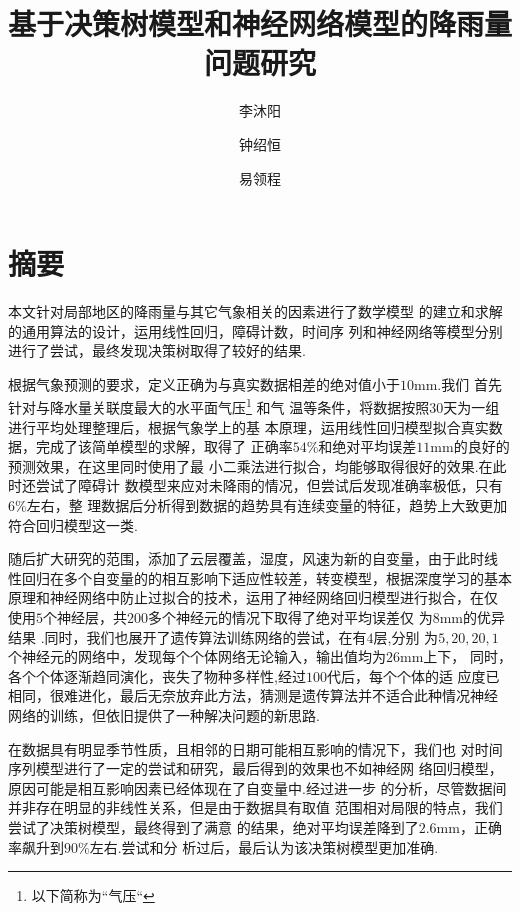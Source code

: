 \documentclass[UTF8, a4paper]{ctexart}
\title{基于决策树模型和神经网络模型的降雨量问题研究}
\author{李沐阳 \and 钟绍恒 \and 易领程}
\begin{document}
\maketitle



\section{摘要}

本文针对局部地区的降雨量与其它气象相关的因素进行了数学模型
的建立和求解的通用算法的设计，运用线性回归，障碍计数，时间序
列和神经网络等模型分别进行了尝试，最终发现决策树取得了较好的结果.

根据气象预测的要求，定义正确为与真实数据相差的绝对值小于$10$\si{\milli\meter}.我们
首先针对与降水量关联度最大的水平面气压\footnote{以下简称为``气压``} 和气
温等条件，将数据按照$30$天为一组进行平均处理整理后，根据气象学上的基
本原理，运用线性回归模型拟合真实数据，完成了该简单模型的求解，取得了
正确率$54 \%$和绝对平均误差$11$\si{\milli\meter}的良好的预测效果，在这里同时使用了最
小二乘法进行拟合，均能够取得很好的效果.在此时还尝试了障碍计
数模型来应对未降雨的情况，但尝试后发现准确率极低，只有$6\%$左右，整
理数据后分析得到数据的趋势具有连续变量的特征，趋势上大致更加符合回归模型这一类.

随后扩大研究的范围，添加了云层覆盖，湿度，风速为新的自变量，由于此时线
性回归在多个自变量的的相互影响下适应性较差，转变模型，根据深度学习的基本
原理和神经网络中防止过拟合的技术，运用了神经网络回归模型进行拟合，在仅
使用$5$个神经层，共$200$多个神经元的情况下取得了绝对平均误差仅
为$8$\si{\milli\meter}的优异结果 .同时，我们也展开了遗传算法训练网络的尝试，在有$4$层,分别
为$5,20,20,1$个神经元的网络中，发现每个个体网络无论输入，输出值均为$26$\si{\milli\meter}上下，
同时，各个个体逐渐趋同演化，丧失了物种多样性,经过$100$代后，每个个体的适
应度已相同，很难进化，最后无奈放弃此方法，猜测是遗传算法并不适合此种情况神经
网络的训练，但依旧提供了一种解决问题的新思路.

在数据具有明显季节性质，且相邻的日期可能相互影响的情况下，我们也
对时间序列模型进行了一定的尝试和研究，最后得到的效果也不如神经网
络回归模型，原因可能是相互影响因素已经体现在了自变量中.经过进一步
的分析，尽管数据间并非存在明显的非线性关系，但是由于数据具有取值
范围相对局限的特点，我们尝试了决策树模型，最终得到了满意
的结果，绝对平均误差降到了$2.6$\si{\milli\meter}，正确率飙升到$90\%$左右.尝试和分
析过后，最后认为该决策树模型更加准确.
\end{document}
